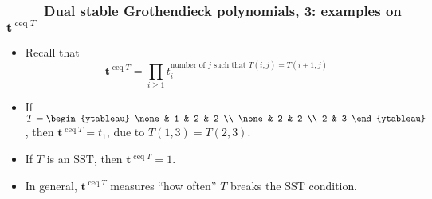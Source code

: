 \documentclass{beamer}
\newcommand{\fti}[1]{\frametitle{\ \ \ \ \ #1}}
\theoremstyle{plain}
\newcommand{\0}{\phantom{c}}
\newcommand{\ceq}{\operatorname{ceq}}
\newcommand{\ttt}{{\mathbf{t}}}
\let\prodnonlimits\prod
\renewcommand{\prod}{\prodnonlimits\limits}
\begin{document}
\begin{frame}
\fti{Dual stable Grothendieck polynomials, 3: examples on $\ttt^{\ceq T}$}


\begin{itemize}

\item Recall that
\[
\ttt^{\ceq T}
= \prod_{i \geq 1} t_i^{\text{number of } j \text{ such that } T\left(i, j\right) = T\left(i+1, j\right)}
\]

\item If $T = \begin{ytableau}
\none & 1 & 2 & 2 \\
\none & 2 & 2 \\
2 & 3
\end{ytableau}$, then $\ttt^{\ceq T} = t_1$, due to $T\left(1, 3\right) = T\left(2, 3\right)$.

\pause
\item If $T$ is an SST, then $\ttt^{\ceq T} = 1$.

\item In general, $\ttt^{\ceq T}$ measures ``how often'' $T$ breaks the SST condition.

\end{itemize}
\end{frame}
\end{document}
